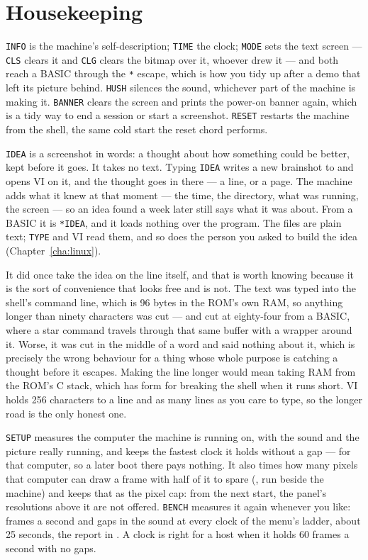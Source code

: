 \section{Housekeeping}
\verb|INFO| is the machine's self-description; \verb|TIME| the clock;
\verb|MODE| sets the text screen --- \verb|CLS| clears it and \verb|CLG|
clears the bitmap over it, whoever drew it --- and both reach a BASIC
through the \texttt{*} escape, which is how you tidy up after a demo that
left its picture behind. \verb|HUSH| silences the sound, whichever part
of the machine is making it. \verb|BANNER| clears the screen and prints
the power-on banner again, which is a tidy way to end a session or start
a screenshot. \verb|RESET| restarts the machine from the shell, the same
cold start the reset chord performs.

\verb|IDEA| is a screenshot in words: a thought about how something could
be better, kept before it goes. It takes no text. Typing \verb|IDEA| writes
a new brainshot to  and opens VI on it, and the
thought goes in there --- a line, or a page. The machine adds what it knew
at that moment --- the time, the directory, what was running, the screen
--- so an idea found a week later still says what it was about. From a
BASIC it is \verb|*IDEA|, and it loads nothing over the program. The files
are plain text; \verb|TYPE| and VI read them, and so does the person you
asked to build the idea (Chapter~\ref{cha:linux}).

It did once take the idea on the line itself, and that is worth knowing
because it is the sort of convenience that looks free and is not. The text
was typed into the shell's command line, which is 96 bytes in the ROM's own
RAM, so anything longer than ninety characters was cut --- and cut at
eighty-four from a BASIC, where a star command travels through that same
buffer with a wrapper around it. Worse, it was cut in the middle of a word
and said nothing about it, which is precisely the wrong behaviour for a
thing whose whole purpose is catching a thought before it escapes. Making
the line longer would mean taking RAM from the ROM's C stack, which has
form for breaking the shell when it runs short. VI holds 256 characters to
a line and as many lines as you care to type, so the longer road is the
only honest one.

\verb|SETUP| measures the computer the machine is running on, with the
sound and the picture really running, and keeps the fastest clock it
holds without a gap --- for that computer, so a later boot there pays
nothing. It also times how many pixels that computer can draw a frame
with half of it to spare (, run beside the
machine) and keeps that as the pixel cap: from the next start, the
panel's resolutions above it are not offered. \verb|BENCH| measures it again whenever you like: frames a
second and gaps in the sound at every clock of the menu's ladder, about
25 seconds, the report in . A clock is
right for a host when it holds 60 frames a second with no gaps.

